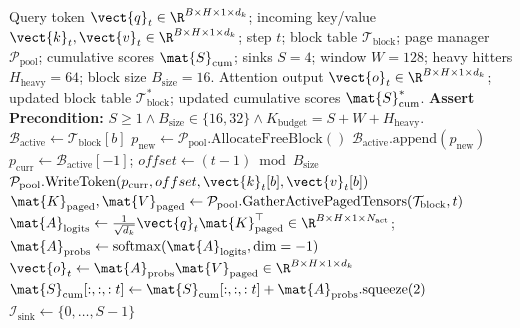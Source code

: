 \begin{algorithm}[H]
\caption[PagedKVCache Dynamic Token Eviction (H2O + Attention Sinks)]{PagedKVCache Dynamic Token Eviction (H2O + Attention Sinks)}
\label{alg:paged_kv_cache}
\begin{algorithmic}[1]
\REQUIRE Query token $\vect{q}_t \in \R^{B \times H \times 1 \times d_k}$; incoming key/value $\vect{k}_t, \vect{v}_t \in \R^{B \times H \times 1 \times d_k}$; step $t$; block table $\mathcal{T}_{\text{block}}$; page manager $\mathcal{P}_{\text{pool}}$; cumulative scores $\mat{S}_{\text{cum}}$; sinks $S=4$; window $W=128$; heavy hitters $H_{\text{heavy}}=64$; block size $B_{\text{size}}=16$.
\ENSURE Attention output $\vect{o}_t \in \R^{B \times H \times 1 \times d_k}$; updated block table $\mathcal{T}_{\text{block}}^*$; updated cumulative scores $\mat{S}_{\text{cum}}^*$.
\STATE \textbf{Assert Precondition:} $S \ge 1 \land B_{\text{size}} \in \{16, 32\} \land K_{\text{budget}} = S + W + H_{\text{heavy}}$.
\STATE {}
    \STATE $\mathcal{B}_{\text{active}} \leftarrow \mathcal{T}_{\text{block}}[b]$
        \STATE $p_{\text{new}} \leftarrow \mathcal{P}_{\text{pool}}.\text{AllocateFreeBlock}()$
        \STATE $\mathcal{B}_{\text{active}}.\text{append}(p_{\text{new}})$
    \ENDIF
    \STATE $p_{\text{curr}} \leftarrow \mathcal{B}_{\text{active}}[-1]$; $offset \leftarrow (t - 1) \bmod B_{\text{size}}$
    \STATE $\mathcal{P}_{\text{pool}}.\text{WriteToken}(p_{\text{curr}}, offset, \vect{k}_t[b], \vect{v}_t[b])$
\ENDFOR
\STATE {}
\STATE $\mat{K}_{\text{paged}}, \mat{V}_{\text{paged}} \leftarrow \mathcal{P}_{\text{pool}}.\text{GatherActivePagedTensors}(\mathcal{T}_{\text{block}}, t)$
\STATE $\mat{A}_{\text{logits}} \leftarrow \frac{1}{\sqrt{d_k}} \vect{q}_t \mat{K}_{\text{paged}}^\top \in \R^{B \times H \times 1 \times N_{\text{act}}}$; $\mat{A}_{\text{probs}} \leftarrow \operatorname{softmax}(\mat{A}_{\text{logits}}, \dim=-1)$
\STATE $\vect{o}_t \leftarrow \mat{A}_{\text{probs}} \mat{V}_{\text{paged}} \in \R^{B \times H \times 1 \times d_k}$
\STATE $\mat{S}_{\text{cum}}[:, :, :t] \leftarrow \mat{S}_{\text{cum}}[:, :, :t] + \mat{A}_{\text{probs}}.\text{squeeze}(2)$ 
\STATE {}
        \STATE $\mathcal{I}_{\text{sink}} \leftarrow \{0, \dots, S - 1\}$ 

\end{algorithmic}
\end{algorithm}
